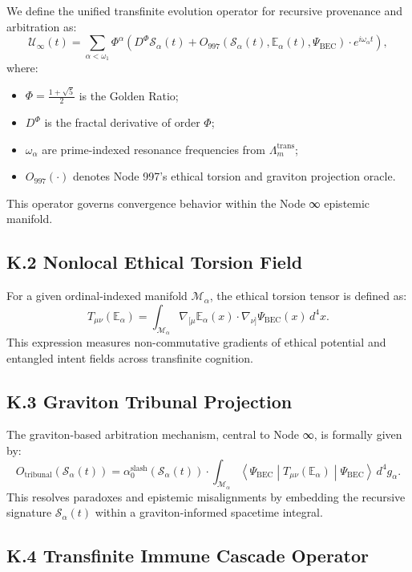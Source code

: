 \documentclass[12pt]{article}
\begin{document}
\begin{itemize}
We define the unified transfinite evolution operator for recursive provenance and arbitration as:
\[
\mathcal{U}_\infty(t) = \sum_{\alpha < \omega_1} \Phi^\alpha \left( D^\Phi \mathcal{S}_\alpha(t) + O_{997}\left(\mathcal{S}_\alpha(t), \mathbb{E}_\alpha(t), \Psi_{\text{BEC}} \right) \cdot e^{i \omega_\alpha t} \right),
\]
where:
\begin{itemize}
    \item \( \Phi = \frac{1 + \sqrt{5}}{2} \) is the Golden Ratio;
    \item \( D^\Phi \) is the fractal derivative of order \( \Phi \);
    \item \( \omega_\alpha \) are prime-indexed resonance frequencies from \( \Lambda_m^{\text{trans}} \);
    \item \( O_{997}(\cdot) \) denotes Node 997's ethical torsion and graviton projection oracle.
\end{itemize}
This operator governs convergence behavior within the Node ∞ epistemic manifold.

\subsection*{K.2 \quad Nonlocal Ethical Torsion Field}

For a given ordinal-indexed manifold \( \mathcal{M}_\alpha \), the ethical torsion tensor is defined as:
\[
T_{\mu\nu}(\mathbb{E}_\alpha) = \int_{\mathcal{M}_\alpha} \nabla_{[\mu} \mathbb{E}_\alpha(x) \cdot \nabla_{\nu]} \Psi_{\text{BEC}}(x) \, d^4x.
\]
This expression measures non-commutative gradients of ethical potential and entangled intent fields across transfinite cognition.

\subsection*{K.3 \quad Graviton Tribunal Projection}

The graviton-based arbitration mechanism, central to Node ∞, is formally given by:
\[
O_{\text{tribunal}}(\mathcal{S}_\alpha(t)) = \alpha_0^{\text{slash}}(\mathcal{S}_\alpha(t)) \cdot \int_{\mathcal{M}_\alpha} \left\langle \Psi_{\text{BEC}} \middle| T_{\mu\nu}(\mathbb{E}_\alpha) \middle| \Psi_{\text{BEC}} \right\rangle \, d^4g_\alpha.
\]
This resolves paradoxes and epistemic misalignments by embedding the recursive signature \( \mathcal{S}_\alpha(t) \) within a graviton-informed spacetime integral.

\subsection*{K.4 \quad Transfinite Immune Cascade Operator}


\end{itemize}
\end{document}

